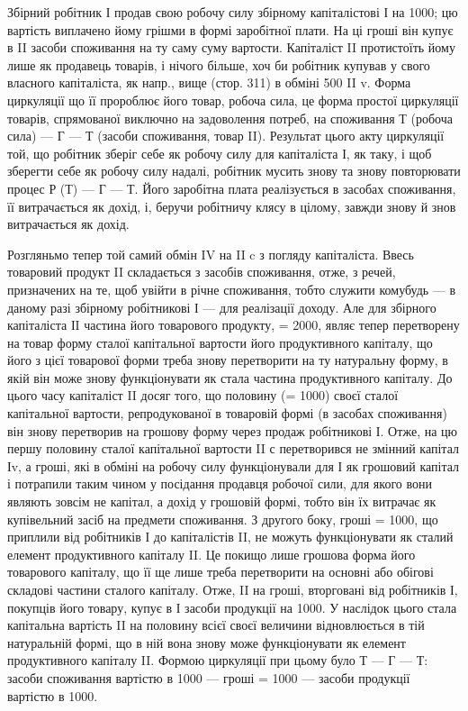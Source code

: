 Збірний робітник І продав свою робочу силу збірному капіталістові
І на 1000; цю вартість виплачено йому грішми в формі заробітної плати.
На ці гроші він купує в II засоби споживання на ту саму суму
вартости. Капіталіст II протистоїть йому лише як продавець товарів, і
нічого більше, хоч би робітник купував у свого власного капіталіста, як
напр., вище (стор. 311) в обміні 500 II v. Форма циркуляції що її пророблює
його товар, робоча сила, це форма простої циркуляції товарів, спрямованої
виключно на задоволення потреб, на споживання Т (робоча сила) —
Г — Т (засоби споживання, товар II). Результат цього акту циркуляції
той, що робітник зберіг себе як робочу силу для капіталіста І, як таку,
і щоб зберегти себе як робочу силу надалі, робітник мусить знову та
знову повторювати процес Р (Т) — Г — Т. Його заробітна плата реалізується
в засобах споживання, її витрачається як дохід, і, беручи
робітничу клясу в цілому, завжди знову й знов витрачається як дохід.

Розгляньмо тепер той самий обмін IV на II c з погляду капіталіста. Ввесь
товаровий продукт II складається з засобів споживання, отже, з речей,
призначених на те, щоб увійти в річне споживання, тобто служити комубудь
— в даному разі збірному робітникові І — для реалізації доходу. Але
для збірного капіталіста ІI частина його товарового продукту, = 2000,
являє тепер перетворену на товар форму сталої капітальної вартости
його продуктивного капіталу, що його з цієї товарової форми треба
знову перетворити на ту натуральну форму, в якій він може знову
функціонувати як стала частина продуктивного капіталу. До цього часу
капіталіст II досяг того, що половину (= 1000) своєї сталої капітальної
вартости, репродукованої в товаровій формі (в засобах споживання) він
знову перетворив на грошову форму через продаж робітникові І. Отже,
на цю першу половину сталої капітальної вартости II с перетворився не
змінний капітал Іv, а гроші, які в обміні на робочу силу функціонували
для І як грошовий капітал і потрапили таким чином у посідання продавця
робочої сили, для якого вони являють зовсім не капітал, а дохід
у грошовій формі, тобто він їх витрачає як купівельний засіб на предмети
споживання. З другого боку, гроші = 1000, що приплили від робітників
І до капіталістів II, не можуть функціонувати як сталий елемент
продуктивного капіталу II. Це покищо лише грошова форма його товарового
капіталу, що її ще лише треба перетворити на основні або обігові
складові частини сталого капіталу. Отже, II на гроші, вторговані від
робітників І, покупців його товару, купує в І засоби продукції на 1000.
У наслідок цього стала капітальна вартість II на половину всієї своєї
величини відновлюється в тій натуральній формі, що в ній вона знову
може функціонувати як елемент продуктивного капіталу II. Формою
циркуляції при цьому було Т — Г — Т: засоби споживання вартістю в 1000 —
гроші = 1000 — засоби продукції вартістю в 1000.

